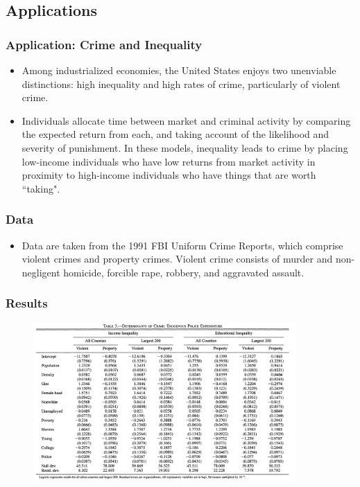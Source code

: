 \documentclass{beamer}
\newcommand{\1}{\mathbb{1}}
\begin{document}
\subsection{Applications}

\begin{frame}
\end{frame}

\begin{frame}\frametitle{Application: Crime and Inequality}
\begin{itemize}
\item Among industrialized economies, the United States
enjoys two unenviable distinctions: high inequality and
high rates of crime, particularly of violent crime. 
\item Individuals allocate time between market and criminal activity by comparing the expected return
 from each, and taking account of the likelihood and severity of punishment. In these models, inequality leads to crime by placing low-income individuals who have low returns from market activity in proximity to high-income individuals who have things that are worth ``taking".
\end{itemize}
\end{frame}

\begin{frame}\frametitle{Data}
\begin{itemize}
\item Data are taken from the 1991 FBI Uniform Crime Reports, which comprise violent crimes and property crimes. Violent crime consists of murder and non-negligent homicide, forcible rape, robbery, and aggravated assault.
\end{itemize}
\end{frame}

\begin{frame}\frametitle{Results}
\begin{figure}
\includegraphics[width = 10cm]{Tables/tabcrime}
\end{figure}
\end{frame}
\end{document}
